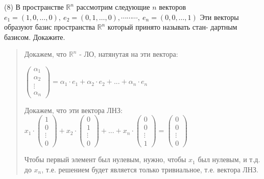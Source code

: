 \documentclass{article}
\begin{document}
(8) В пространстве $\mathbb{R}^n$ рассмотрим следующие $n$ векторов $e_1 = (1,0, … , 0), \ e_2 = (0,1, … , 0), ⋯ ⋯ ⋯, \ e_n = (0,0, … , 1)$ Эти векторы образуют базис пространства $\mathbb{R}^n$ который принято называть стан- дартным базисом. Докажите. 
\begin{quote}
    Докажем, что $\mathbb{R}^n$ - ЛО, натянутая на эти вектора:

    $\begin{pmatrix}
        \alpha_1 \\ \alpha_2 \\ \vdots \\ \alpha_n
    \end{pmatrix} = \alpha_1 \cdot e_1 + \alpha_2 \cdot e_2 + ... + \alpha_n \cdot e_n$

    Докажем, что эти вектора ЛНЗ:
    $
    x_1 \cdot \begin{pmatrix}
        1 \\ 0 \\ \vdots \\ 0
    \end{pmatrix} +     x_2 \cdot \begin{pmatrix}
        0 \\ 1 \\ \vdots \\ 0
    \end{pmatrix} + ... +    x_n \cdot \begin{pmatrix}
        0 \\ 0 \\ \vdots \\ 1
    \end{pmatrix} = \begin{pmatrix}
        0 \\ 0 \\ \vdots \\ 0
    \end{pmatrix}
    $

    Чтобы первый элемент был нулевым, нужно, чтобы $x_1$ был нулевым, и т.д. до $x_n$, т.е. решением будет является только тривиальное, т.е. вектора ЛНЗ.
\end{quote}
\end{document}

